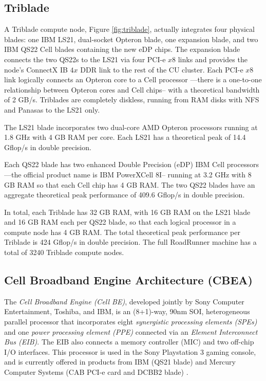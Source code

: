 \documentclass[letter,10pt]{article}
\begin{document}
\subsection*{Triblade}

A Triblade compute node, Figure \ref{fig:triblade}, actually integrates four physical blades: one IBM LS21, dual-socket Opteron blade, one expansion blade, and two IBM QS22 Cell blades containing the new eDP chips.  The expansion blade connects the two QS22s to the LS21 via four PCI-e $x8$ links and provides the node's ConnectX IB $4x$ DDR link to the rest of the CU cluster.  Each PCI-e $x8$ link logically connects an Opteron core to a Cell processor ---there is a one-to-one relationship between Opteron cores and Cell chips-- with a theoretical bandwidth of 2 GB/s.  Triblades are completely diskless, running from RAM disks with NFS and Panasas \cite{panasas} to the LS21 only.

The LS21 blade incorporates two dual-core AMD Opteron processors running at 1.8 GHz with 4 GB RAM per core.  Each LS21 has a theoretical peak of 14.4 Gflop/s in double precision.

Each QS22 blade has two enhanced Double Precision (eDP) IBM Cell processors ---the official product name is IBM PowerXCell 8I-- running at 3.2 GHz with 8 GB RAM so that each Cell chip has 4 GB RAM.  The two QS22 blades have an aggregate theoretical peak performance of 409.6 Gflop/s in double precision.

In total, each Triblade has 32 GB RAM, with 16 GB RAM on the LS21 blade and 16 GB RAM each per QS22 blade, so that each logical processor in a compute node has 4 GB RAM.  The total theoretical peak performance per Triblade is 424 Gflop/s in double precision.  The full RoadRunner machine has a total of 3240 Triblade compute nodes.

\subsection*{Cell Broadband Engine Architecture (CBEA)}

The \emph{Cell Broadband Engine (Cell BE)}, developed jointly by Sony Computer Entertainment, Toshiba, and IBM, is an (8+1)-way, 90nm SOI, heterogeneous parallel processor that incorporates eight \emph{synergistic processing elements (SPEs)} and one \emph{power processing element (PPE)} connected via an \emph{Element Interconnect Bus (EIB)}.  The EIB also connects a memory controller (MIC) and two off-chip I/O interfaces.  This processor is used in the Sony Playstation 3 gaming console, and is currently offered in products from IBM (QS21 blade) and Mercury Computer Systems (CAB PCI-e card and DCBB2 blade) \cite{mercury}.
\end{document}
